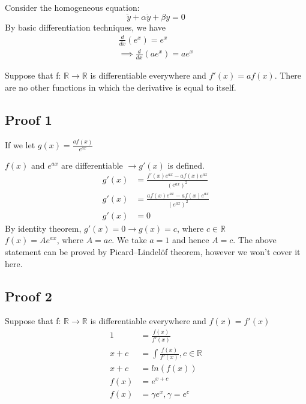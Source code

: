 \documentclass{article}
\begin{document}
Consider the homogeneous equation:
\begin{equation}
\ddot{y}+ \alpha\dot{y}+ \beta y = 0
\end{equation}
By basic differentiation techniques, we have 
 \begin{align}
 \frac{d}{dx}(e^x)=e^x\\
 \implies \frac{d}{dx}(ae^x)=ae^x
 \end{align}
 
 Suppose that f: $\mathbb{R} \rightarrow \mathbb{R}$ is differentiable everywhere and $f'(x)=af(x)$.
 There are no other functions in which the derivative is equal to itself. 
 \subsection{Proof 1}

 If we let $g(x)=\frac{af(x)}{e^{ax}}$


$ f(x)$ and $e^{ax}$ are differentiable $\rightarrow g'(x)$ is defined.
\begin{align}
     g'(x)&=\frac{f'(x)e^{ax}-af(x)e^{ax}}{(e^{ax})^2}\\
     g'(x)&=\frac{af(x)e^{ax}-af(x)e^{ax}}{(e^{ax})^2}\\
     g'(x)&=0
\end{align}
 By identity theorem, $g'(x)=0\rightarrow g(x)= c$, where $c\in \mathbb{R}$\\
 \implies $f(x)=Ae^{ax}$, where $A=ac$. We take $a=1$ and hence $A=c$.
 The above statement can be proved by Picard–Lindelöf theorem, however we won't cover it here.
 \subsection{Proof 2}
 Suppose that f: $\mathbb{R} \rightarrow \mathbb{R}$ is differentiable everywhere and $f(x)=f'(x)$
 \begin{align}
     1&=\frac{f(x)}{f'(x)}\\
     x+c&=\int{\frac{f(x)}{f'(x)}}, c\in \mathbb{R}\\
     x+c&=ln(f(x))\\
     f(x)&=e^{x+c}\\
     f(x)&=\gamma e^x, \gamma =e^c
 \end{align}
\end{document}
